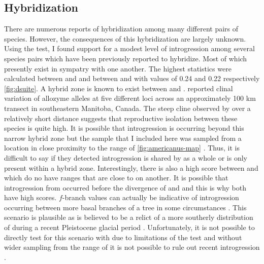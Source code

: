 \subsection{Hybridization}
There are numerous reports of hybridization among many different pairs of 
\anaxyrus species. 
However, the consequences of this hybridization are largely unknown. 
Using the \fbranch test, I found support for a modest level of introgression 
among several species pairs which have been previously reported to hybridize. 
Most of which presently exist in sympatry with one another.
The highest \fbranch statistics were calculated between \amer and \hemiophrys and 
between \amer and \baxteri with values of 0.24 and 0.22 respectively \cref{fig:dsuite}.
A hybrid zone is known to exist between \amer and \hemiophrys.
\cite{green1983} reported clinal variation of allozyme alleles at five different 
loci across an approximately 100 km transect in southeastern Manitoba, Canada.
The steep cline observed by \cite{green1983} over a relatively short distance suggests that reproductive 
isolation between these species is quite high. 
It is possible that introgression is occurring beyond this narrow hybrid zone
but the sample that I included here was sampled from a location in close proximity 
to the range of \amer \cref{fig:americanus-map} \parencite{conant1998}.
Thus, it is difficult to say if they detected introgression is shared by 
\hemiophrys as a whole or is only present within a hybrid zone.
Interestingly, there is also a high \fbranch score between \amer and \baxteri
which do no have ranges that are close to on another. 
It is possible that introgression from \amer occurred before the divergence  
of \hemiophrys and \baxteri and this is why both have high \fbranch scores. 
$f$-branch values can actually be indicative of introgression occurring between 
more basal branches of a tree in some circumstances \parencite{malinsky2021}.
This scenario is plausible as \baxteri is believed to be a relict of a more 
southerly distribution of \hemiophrys during a recent Pleistocene glacial period 
\parencite{henrich1968}.
Unfortunately, it is not possible to directly test for this scenario with \dsuite
due to limitations of the \fbranch test and without wider sampling from the range 
of \hemiophrys it is not possible to rule out recent introgression \parencite{malinsky2021}.

